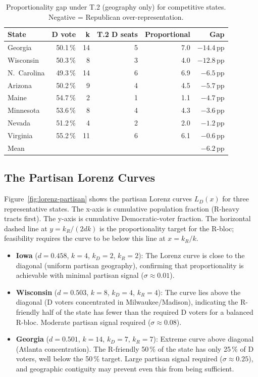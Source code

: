 \begin{table}[h]
\centering
\caption{Proportionality gap under T.2 (geography only) for competitive states.
Negative = Republican over-representation.}
\label{tab:gap-baseline}
\begin{tabular}{lrrrrr}
\toprule
State & D vote & k & T.2 D seats & Proportional & Gap \\
\midrule
Georgia   & 50.1\,\% & 14 & 5 & 7.0 & $-14.4$\,pp \\
Wisconsin & 50.3\,\% &  8 & 3 & 4.0 & $-12.8$\,pp \\
N.\ Carolina & 49.3\,\% & 14 & 6 & 6.9 & $-6.5$\,pp \\
Arizona   & 50.2\,\% &  9 & 4 & 4.5 & $-5.7$\,pp \\
Maine     & 54.7\,\% &  2 & 1 & 1.1 & $-4.7$\,pp \\
Minnesota & 53.6\,\% &  8 & 4 & 4.3 & $-3.6$\,pp \\
Nevada    & 51.2\,\% &  4 & 2 & 2.0 & $-1.2$\,pp \\
Virginia  & 55.2\,\% & 11 & 6 & 6.1 & $-0.6$\,pp \\
\midrule
Mean      &          &   &   &     & $-6.2$\,pp \\
\bottomrule
\end{tabular}
\end{table}

\subsection{The Partisan Lorenz Curves}

Figure~\ref{fig:lorenz-partisan} shows the partisan Lorenz curves $L_D(x)$ for
three representative states.
The x-axis is cumulative population fraction (R-heavy tracts first).
The y-axis is cumulative Democratic-voter fraction.
The horizontal dashed line at $y = k_R/(2dk)$ is the proportionality target
for the R-bloc; feasibility requires the curve to be below this line at $x = k_R/k$.

\begin{itemize}
\item \textbf{Iowa} ($d = 0.458$, $k=4$, $k_D=2$, $k_R=2$): The Lorenz curve
  is close to the diagonal (uniform partisan geography), confirming that
  proportionality is achievable with minimal partisan signal ($\sigma \approx 0.01$).

\item \textbf{Wisconsin} ($d = 0.503$, $k=8$, $k_D=4$, $k_R=4$): The curve
  lies above the diagonal (D voters concentrated in Milwaukee/Madison),
  indicating the R-friendly half of the state has fewer than the required
  D voters for a balanced R-bloc. Moderate partisan signal required ($\sigma \approx 0.08$).

\item \textbf{Georgia} ($d = 0.501$, $k=14$, $k_D=7$, $k_R=7$): Extreme
  curve above diagonal (Atlanta concentration). The R-friendly 50\,\% of the
  state has only 25\,\% of D voters, well below the 50\,\% target. Large
  partisan signal required ($\sigma \approx 0.25$), and geographic contiguity
  may prevent even this from being sufficient.
\end{itemize}

